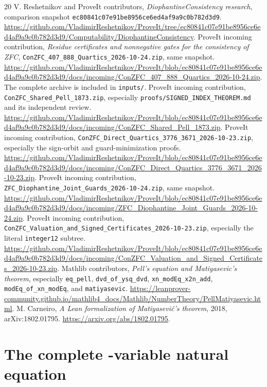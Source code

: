 \documentclass[10pt,letterpaper]{article}
\theoremstyle{remark}\newtheorem{remark}[theorem]{Remark}
\newcommand{\file}[1]{\texttt{\nolinkurl{#1}}}
\begin{document}
\begin{thebibliography}{20}
 V. Reshetnikov and ProveIt contributors,
\emph{DiophantineConsistency research}, comparison snapshot
\file{ec80841c07e91be8956ce6ed4af9a9c0b782d3d9}.
\url{https://github.com/VladimirReshetnikov/ProveIt/tree/ec80841c07e91be8956ce6ed4af9a9c0b782d3d9/Computability/DiophantineConsistency}.
 ProveIt incoming contribution,
\emph{Residue certificates and nonnegative gates for the consistency of ZFC},
\file{ConZFC_407_888_Quartics_2026-10-24.zip}, same snapshot.
\url{https://github.com/VladimirReshetnikov/ProveIt/blob/ec80841c07e91be8956ce6ed4af9a9c0b782d3d9/docs/incoming/ConZFC_407_888_Quartics_2026-10-24.zip}.
The complete archive is included in \file{inputs/}.
 ProveIt incoming contribution,
\file{ConZFC_Shared_Pell_1873.zip}, especially
\file{proofs/SIGNED_INDEX_THEOREM.md} and its independent review.
\url{https://github.com/VladimirReshetnikov/ProveIt/blob/ec80841c07e91be8956ce6ed4af9a9c0b782d3d9/docs/incoming/ConZFC_Shared_Pell_1873.zip}.
 ProveIt incoming contribution,
\file{ConZFC_Direct_Quartics_3776_3671_2026-10-23.zip}, especially the
sign-orbit and guard-minimization proofs.
\url{https://github.com/VladimirReshetnikov/ProveIt/blob/ec80841c07e91be8956ce6ed4af9a9c0b782d3d9/docs/incoming/ConZFC_Direct_Quartics_3776_3671_2026-10-23.zip}.
 ProveIt incoming contribution,
\file{ZFC_Diophantine_Joint_Guards_2026-10-24.zip}, same snapshot.
\url{https://github.com/VladimirReshetnikov/ProveIt/blob/ec80841c07e91be8956ce6ed4af9a9c0b782d3d9/docs/incoming/ZFC_Diophantine_Joint_Guards_2026-10-24.zip}.
 ProveIt incoming contribution,
\file{ConZFC_Valuation_and_Signed_Certificates_2026-10-23.zip},
especially the literal \file{integer12} subtree.
\url{https://github.com/VladimirReshetnikov/ProveIt/blob/ec80841c07e91be8956ce6ed4af9a9c0b782d3d9/docs/incoming/ConZFC_Valuation_and_Signed_Certificates_2026-10-23.zip}.
 Mathlib contributors, \emph{Pell's equation and
Matiyasevic's theorem}, especially \file{eq_pell},
\file{dvd_of_ysq_dvd}, \file{xn_modEq_x2n_add},
\file{modEq_of_xn_modEq}, and \file{matiyasevic}.
\url{https://leanprover-community.github.io/mathlib4_docs/Mathlib/NumberTheory/PellMatiyasevic.html}.
 M. Carneiro, \emph{A Lean formalization of
Matiyasevi\v{c}'s theorem}, 2018, arXiv:1802.01795.
\url{https://arxiv.org/abs/1802.01795}.
\end{thebibliography}

\clearpage\appendix
\section{The complete \nvars-variable natural equation}\label{app:natural}
\end{document}
